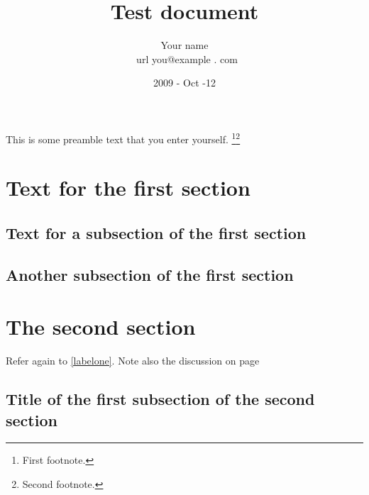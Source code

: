 \documentclass{article}
\title { Test document }
\author { Your name \\ \ url { you@example . com }}
\date{2009 - Oct -12}
\begin{document}
\maketitle
\tableofcontents
\newpage


This is some preamble text that you enter yourself. \footnote{First footnote.}\footnote{Second footnote.}

%
\section { Text for the first section }
\lipsum [1]

\subsection { Text for a subsection of the first section }
\lipsum [2 -3]
\label{labelone}

\subsection { Another subsection of the first section }
\lipsum [4 -5]
\label{labeltwo}

\section { The second section }
\lipsum [6]

Refer again to \ref{labelone}. \cite{ConcreteMath}
Note also the discussion on page \pageref{labeltwo}

\subsection { Title of the first subsection of the second section }

\lipsum [7]
\end{document}
